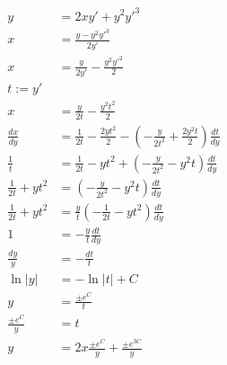 \begin{align*}
    y                   & = 2xy' + y^2 y'^3                                                      \tag{1}                   \\
    x                   & = \frac{y - y^2 y'^3}{2y'}                                                                       \\
    x                   & = \frac{y}{2y'} - \frac{y^2 y'^2}{2}                                                             \\
    t := y'                                                                                                                \\
    x                   & = \frac{y}{2t} - \frac{y^2 t^2}{2}                                                               \\
    \frac{dx}{dy}       & = \frac{1}{2t} - \frac{2yt^2}{2} - \left(-\frac{y}{2t^2} + \frac{2 y^2 t}{2}\right)\frac{dt}{dy} \\
    \frac{1}{t}         & = \frac{1}{2t} - yt^2 + \left(-\frac{y}{2t^2} - y^2t\right)\frac{dt}{dy}                         \\
    \frac{1}{2t} + yt^2 & = \left(-\frac{y}{2t^2} - y^2t\right)\frac{dt}{dy}                                               \\
    \frac{1}{2t} + yt^2 & = \frac{y}{t}\left(-\frac{1}{2t} - yt^2\right)\frac{dt}{dy}              \tag{2}                 \\
    1                   & = -\frac{y}{t}\frac{dt}{dy}                                                                      \\
    \frac{dy}{y}        & = -\frac{dt}{t}                                                                                  \\
    \ln |y|             & = -\ln |t| + C                                                                                   \\
    y                   & = \frac{\pm e^C}{t}                                                                              \\
    \frac{\pm e^C}{y}   & = t                                                                                              \\
    y                   & = 2x\frac{\pm e^C}{y} + \frac{\pm e^{3C}}{y}                                                     \\
\end{align*}

